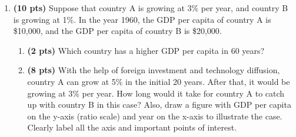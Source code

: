 \documentclass[14pt, oneside]{memoir}
\begin{document}
\begin{enumerate}[label=\textbf{\arabic*.}, itemsep=15pt]
\begin{enumerate}[label=(\alph*)]
	\item \[\text{GDP price deflator} = \frac{\text{Nominal GDP}}{\text{Real GDP}}\times 100\]
	* It is okay to be without the ``$\times 100$" part.
	
	
	In 2020, the deflator is equal to $P_{2020} = 9420/10764.8 = 87.51$
	
	In 2021, the deflator is equal to $P_{2021} = 17752/19209.6 = 92.41$
	
	In 2022, the deflator is equal to $P_{2022} = 100$
		
	
	\item The Laspeyres or Paasche index uses the prices from the initial or final year as weights for the change in quantity. If prices change significantly over time, these indices may overestimate or underestimate the change in quantity. The Fisher index addresses this issue by taking the geometric average of the two. However, chain-weighted GDP is not equal to the sum of chain-weighted consumption and investment.
	
\end{enumerate}




 \vfill


\newpage

\item  \textbf{(10 pts)}\label{P2}
Suppose that country A is growing at 3\% per year, and country B is growing at 1\%. In the year 1960, the GDP per capita of country A is \$10,000, and the GDP per capita of country B is \$20,000.

\begin{enumerate}[label=(\alph*)]
	\item \textbf{(2 pts)} Which country has a higher GDP per capita in 60 years? 
	
	\vspace{5cm}
	
	
	\item \textbf{(8  pts)} With the help of foreign investment and technology diffusion, country A can grow at 5\% in the initial 20 years. After that, it would be growing at 3\% per year. How long would it take for country A to catch up with country B in this case? Also, draw a figure with GDP per capita on the y-axis (ratio scale) and year on the x-axis to illustrate the case. Clearly label all the axis and important points of interest.
	

\end{enumerate}
\end{enumerate}
\end{document}
